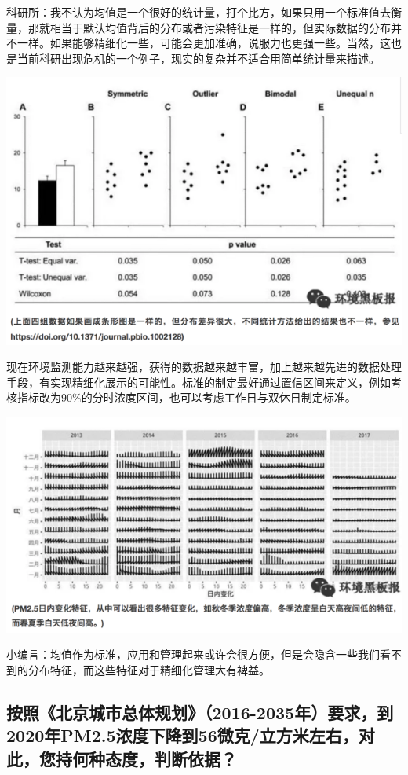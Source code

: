 \documentclass[]{book}
\begin{document}
科研所：我不认为均值是一个很好的统计量，打个比方，如果只用一个标准值去衡量，那就相当于默认均值背后的分布或者污染特征是一样的，但实际数据的分布并不一样。如果能够精细化一些，可能会更加准确，说服力也更强一些。当然，这也是当前科研出现危机的一个例子，现实的复杂并不适合用简单统计量来描述。

\includegraphics[width=8.33in]{images/air3}

现在环境监测能力越来越强，获得的数据越来越丰富，加上越来越先进的数据处理手段，有实现精细化展示的可能性。标准的制定最好通过置信区间来定义，例如考核指标改为90\%的分时浓度区间，也可以考虑工作日与双休日制定标准。

\includegraphics[width=8.33in]{images/air4}

小编言：均值作为标准，应用和管理起来或许会很方便，但是会隐含一些我们看不到的分布特征，而这些特征对于精细化管理大有裨益。

\subsection{按照《北京城市总体规划》（2016-2035年）要求，到2020年PM2.5浓度下降到56微克/立方米左右，对此，您持何种态度，判断依据？}\label{2016-20352020pm2.556}
\end{document}
